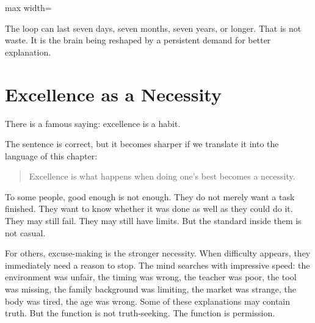 \begin{center}
\begin{adjustbox}{max width=\linewidth}
\end{adjustbox}
\end{center}

The loop can last seven days, seven months, seven years, or longer. That is not waste. It is the brain being reshaped by a persistent demand for better explanation.

\section*{Excellence as a Necessity}

There is a famous saying: excellence is a habit.

The sentence is correct, but it becomes sharper if we translate it into the language of this chapter:

\begin{quote}
Excellence is what happens when doing one's best becomes a necessity.
\end{quote}

To some people, good enough is not enough. They do not merely want a task finished. They want to know whether it was done as well as they could do it. They may still fail. They may still have limits. But the standard inside them is not casual.

For others, excuse-making is the stronger necessity. When difficulty appears, they immediately need a reason to stop. The mind searches with impressive speed: the environment was unfair, the timing was wrong, the teacher was poor, the tool was missing, the family background was limiting, the market was strange, the body was tired, the age was wrong. Some of these explanations may contain truth. But the function is not truth-seeking. The function is permission.

